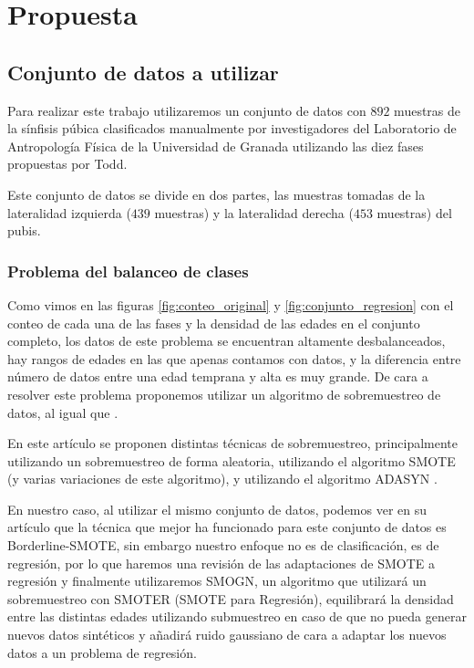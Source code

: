 \section{Propuesta}

\subsection{Conjunto de datos a utilizar}

Para realizar este trabajo utilizaremos un conjunto de datos con $892$ muestras de la sínfisis púbica clasificados manualmente por investigadores del Laboratorio de Antropología Física de la Universidad de Granada utilizando las diez fases propuestas por Todd.

Este conjunto de datos se divide en dos partes, las muestras tomadas de la lateralidad izquierda ($439$ muestras) y la lateralidad derecha ($453$ muestras) del pubis.

\subsubsection{Problema del balanceo de clases}

Como vimos en las figuras \ref{fig:conteo_original} y \ref{fig:conjunto_regresion} con el conteo de cada una de las fases y la densidad de las edades en el conjunto completo, los datos de este problema se encuentran altamente desbalanceados, hay rangos de edades en las que apenas contamos con datos, y la diferencia entre número de datos entre una edad temprana y alta es muy grande. De cara a resolver este problema proponemos utilizar un algoritmo de sobremuestreo de datos, al igual que \cite{NSLVOrdAge}.

En este artículo se proponen distintas técnicas de sobremuestreo, principalmente utilizando un sobremuestreo de forma aleatoria, utilizando el algoritmo SMOTE \cite{revisionSMOTE} (y varias variaciones de este algoritmo), y utilizando el algoritmo ADASYN \cite{propuestaADASYN}.

En nuestro caso, al utilizar el mismo conjunto de datos, podemos ver en su artículo que la técnica que mejor ha funcionado para este conjunto de datos es Borderline-SMOTE, sin embargo nuestro enfoque no es de clasificación, es de regresión, por lo que haremos una revisión de las adaptaciones de SMOTE a regresión y finalmente utilizaremos SMOGN, un algoritmo que utilizará un sobremuestreo con SMOTER (SMOTE para Regresión), equilibrará la densidad entre las distintas edades utilizando submuestreo en caso de que no pueda generar nuevos datos sintéticos y añadirá ruido gaussiano de cara a adaptar los nuevos datos a un problema de regresión.

